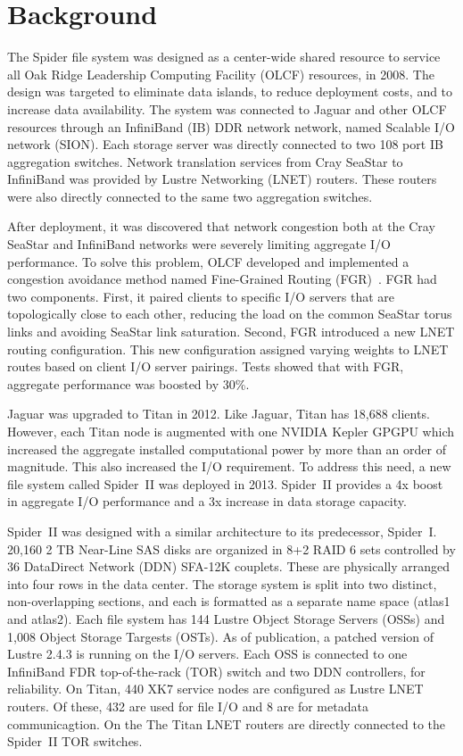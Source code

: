 \section{Background}

The Spider file system was designed as a center-wide shared resource to service
all Oak Ridge Leadership Computing Facility (OLCF) resources, in 2008. The
design was targeted to eliminate data islands, to reduce deployment costs, and
to increase data availability. The system was connected to Jaguar and other
OLCF resources through an InfiniBand (IB) DDR network network, named Scalable
I/O network (SION).  Each storage server was directly connected to two 108 port
IB aggregation switches.  Network translation services from Cray SeaStar to
InfiniBand was provided by Lustre Networking (LNET) routers. These routers were
also directly connected to the same two aggregation switches.    

After deployment, it was discovered that network congestion both at the Cray
SeaStar and InfiniBand networks were severely limiting aggregate I/O
performance. To solve this problem, OLCF developed and implemented a congestion
avoidance method named Fine-Grained Routing (FGR)~\cite{dillow-fgr}. FGR had
two components.  First, it paired clients to specific I/O servers that are
topologically close to each other, reducing the load on the common SeaStar
torus links and avoiding SeaStar link saturation. Second, FGR introduced a new
LNET routing configuration. This new configuration assigned varying weights to
LNET routes based on client I/O server pairings. Tests showed that with
FGR, aggregate performance was boosted by 30\%.   
 
Jaguar was upgraded to Titan in 2012. Like Jaguar, Titan has 18,688 clients.
However, each Titan node is augmented with one NVIDIA Kepler GPGPU
which increased the aggregate installed computational power by more than an
order of magnitude.  This also increased the I/O requirement. To address this
need, a new file system called Spider~II was deployed in 2013. Spider~II
provides a 4x boost in aggregate I/O performance and a 3x increase in data
storage capacity.

Spider~II was designed with a similar architecture to its predecessor,
Spider~I.  20,160 2 TB Near-Line SAS disks are organized in 8+2 RAID 6 sets
controlled by 36 DataDirect Network (DDN) SFA-12K couplets. These are
physically arranged into four rows in the data center.  The storage system is
split into two distinct, non-overlapping sections, and each is formatted as a
separate name space (atlas1 and atlas2). Each file system has 144 Lustre Object
Storage Servers (OSSs) and 1,008 Object Storage Targests (OSTs). As of
publication, a patched version of Lustre 2.4.3 is running on the I/O servers.
Each OSS is connected to one InfiniBand FDR top-of-the-rack (TOR) switch and
two DDN controllers, for reliability.  On Titan, 440 XK7 service nodes are
configured as Lustre LNET routers. Of these, 432 are used for file I/O and 8
are for metadata communicagtion.  On the The Titan LNET routers are directly
connected to the Spider~II TOR switches.

 

